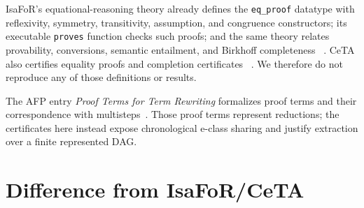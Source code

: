 \documentclass[11pt,a4paper]{article}
\begin{document}
IsaFoR's equational-reasoning theory already defines the \texttt{eq\_proof}
datatype with reflexivity, symmetry, transitivity, assumption, and congruence
constructors; its executable \texttt{proves} function checks such proofs; and
the same theory relates provability, conversions, semantic entailment, and
Birkhoff completeness
~\cite{isafor-equational-reasoning}.  CeTA also certifies equality proofs and
completion certificates
~\cite{recording-completion,certified-equational-reasoning,isafor-ceta}.  We
therefore do not reproduce any of those definitions or results.

The AFP entry \emph{Proof Terms for Term Rewriting} formalizes proof terms and
their correspondence with multisteps~\cite{afp-proof-terms}.  Those proof terms
represent reductions; the certificates here instead expose chronological
e-class sharing and justify extraction over a finite represented DAG.

\section{Difference from IsaFoR/CeTA}
\end{document}
